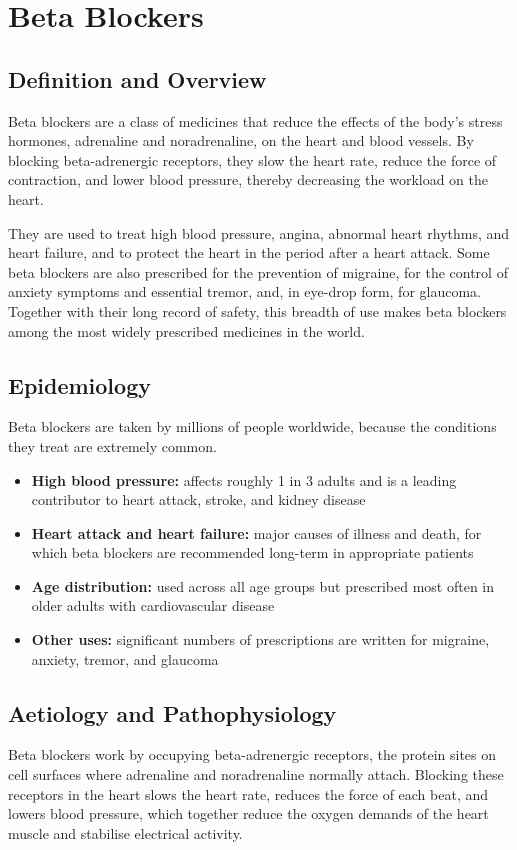 \chapter{Beta Blockers}

\section*{Definition and Overview}
Beta blockers are a class of medicines that reduce the effects of the body's stress hormones, adrenaline and noradrenaline, on the heart and blood vessels. By blocking beta-adrenergic receptors, they slow the heart rate, reduce the force of contraction, and lower blood pressure, thereby decreasing the workload on the heart.

They are used to treat high blood pressure, angina, abnormal heart rhythms, and heart failure, and to protect the heart in the period after a heart attack. Some beta blockers are also prescribed for the prevention of migraine, for the control of anxiety symptoms and essential tremor, and, in eye-drop form, for glaucoma. Together with their long record of safety, this breadth of use makes beta blockers among the most widely prescribed medicines in the world.

\section*{Epidemiology}
Beta blockers are taken by millions of people worldwide, because the conditions they treat are extremely common.

\begin{itemize}
    \item \textbf{High blood pressure:} affects roughly 1 in 3 adults and is a leading contributor to heart attack, stroke, and kidney disease
    \item \textbf{Heart attack and heart failure:} major causes of illness and death, for which beta blockers are recommended long-term in appropriate patients
    \item \textbf{Age distribution:} used across all age groups but prescribed most often in older adults with cardiovascular disease
    \item \textbf{Other uses:} significant numbers of prescriptions are written for migraine, anxiety, tremor, and glaucoma
\end{itemize}

\section*{Aetiology and Pathophysiology}
Beta blockers work by occupying beta-adrenergic receptors, the protein sites on cell surfaces where adrenaline and noradrenaline normally attach. Blocking these receptors in the heart slows the heart rate, reduces the force of each beat, and lowers blood pressure, which together reduce the oxygen demands of the heart muscle and stabilise electrical activity.

